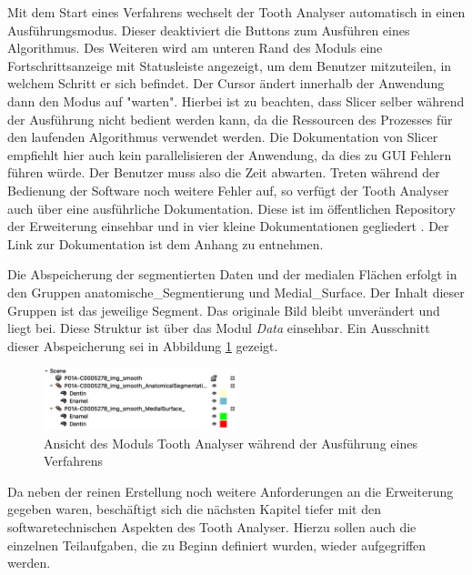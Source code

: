 Mit dem Start eines Verfahrens wechselt der Tooth Analyser automatisch in einen
Ausführungsmodus. Dieser deaktiviert die Buttons zum Ausführen eines Algorithmus.
Des Weiteren wird am unteren Rand des Moduls eine Fortschrittsanzeige mit
Statusleiste angezeigt, um dem Benutzer mitzuteilen, in welchem Schritt er sich
befindet. Der Cursor ändert innerhalb der Anwendung dann den Modus auf "warten".
Hierbei ist zu beachten, dass Slicer selber während der Ausführung nicht bedient
werden kann, da die Ressourcen des Prozesses für den laufenden Algorithmus
verwendet werden. Die Dokumentation von Slicer empfiehlt hier auch kein parallelisieren
der Anwendung, da dies zu \ac{GUI} Fehlern führen würde. Der Benutzer muss also
die Zeit abwarten. Treten während der Bedienung der Software noch weitere Fehler
auf, so verfügt der Tooth Analyser auch über eine ausführliche Dokumentation. Diese
ist im öffentlichen Repository der Erweiterung einsehbar und in vier kleine Dokumentationen
gegliedert \citep[vgl.][]{procida2017}. Der Link zur Dokumentation ist dem Anhang
zu entnehmen.

Die Abspeicherung der segmentierten Daten und der medialen Flächen erfolgt in den
Gruppen anatomische\_Segmentierung und Medial\_Surface. Der Inhalt dieser
Gruppen ist das jeweilige Segment. Das originale Bild bleibt unverändert und liegt
bei. Diese Struktur ist über das Modul \textit{Data} einsehbar. Ein Ausschnitt
dieser Abspeicherung sei in Abbildung \ref{fig:data_module} gezeigt.

\pagebreak

\begin{figure}[h]
	\centering
	\includegraphics[width=0.5\textwidth]{img/data_module.png}
	\caption{Ansicht des Moduls Tooth Analyser während der Ausführung eines
	Verfahrens}
	\label{fig:data_module}
\end{figure}

Da neben der reinen Erstellung noch weitere Anforderungen an die Erweiterung
gegeben waren, beschäftigt sich die nächsten Kapitel tiefer mit den softwaretechnischen
Aspekten des Tooth Analyser. Hierzu sollen auch die einzelnen Teilaufgaben, die zu
Beginn definiert wurden, wieder aufgegriffen werden.

